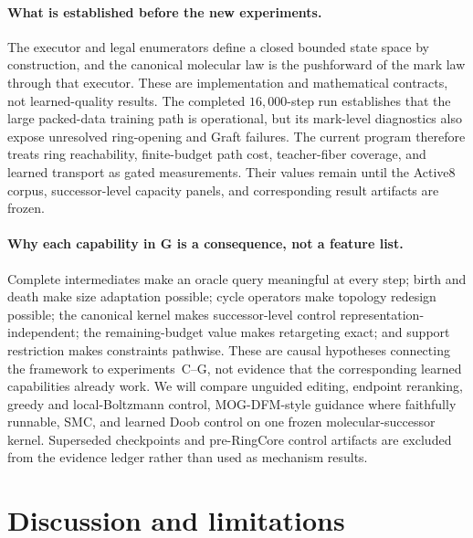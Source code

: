 \documentclass{article}
\theoremstyle{definition}
\theoremstyle{remark}
\begin{document}
\paragraph{What is established before the new experiments.}
The executor and legal enumerators define a closed bounded state space by construction, and the canonical molecular law is the pushforward of the mark law through that executor. These are implementation and mathematical contracts, not learned-quality results. The completed $16{,}000$-step run establishes that the large packed-data training path is operational, but its mark-level diagnostics also expose unresolved ring-opening and Graft failures. The current program therefore treats ring reachability, finite-budget path cost, teacher-fiber coverage, and learned transport as gated measurements. Their values remain \XXX{} until the Active8 corpus, successor-level capacity panels, and corresponding result artifacts are frozen.

\paragraph{Why each capability in G is a consequence, not a feature list.}
Complete intermediates make an oracle query meaningful at every step; birth and death make size adaptation possible; cycle operators make topology redesign possible; the canonical kernel makes successor-level control representation-independent; the remaining-budget value makes retargeting exact; and support restriction makes constraints pathwise. These are causal hypotheses connecting the framework to experiments~C--G, not evidence that the corresponding learned capabilities already work. We will compare unguided editing, endpoint reranking, greedy and local-Boltzmann control, MOG-DFM-style guidance where faithfully runnable, SMC, and learned Doob control on one frozen molecular-successor kernel. Superseded checkpoints and pre-RingCore control artifacts are excluded from the evidence ledger rather than used as mechanism results.

\section{Discussion and limitations}
\label{sec:limits}
\end{document}
